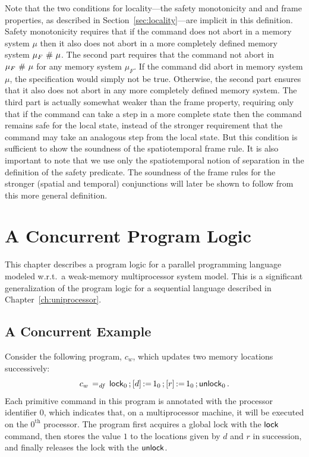 \documentclass[11pt]{report}
\begin{document}
Note that the two conditions for locality---the safety monotonicity and and frame properties, as described in Section~\ref{sec:locality}---are implicit in this definition. Safety monotonicity requires that if the command does not abort in a memory system $\mu$ then it also does not abort in a more completely defined memory system $\mu_F \operatorname{\,\#\,} \mu$. The second part requires that the command not abort in $\mu_F \operatorname{\,\#\,} \mu$ for any memory system $\mu_F$. If the command did abort in memory system $\mu$, the specification would simply not be true. Otherwise, the second part ensures that it also does not abort in any more completely defined memory system. The third part is actually somewhat weaker than the frame property, requiring only that if the command can take a step in a more complete state then the command remains safe for the local state, instead of the stronger requirement that the command may take an analogous step from the local state. But this condition is sufficient to show the soundness of the spatiotemporal frame rule. It is also important to note that we use only the spatiotemporal notion of separation in the definition of the safety predicate. The soundness of the frame rules for the stronger (spatial and temporal) conjunctions will later be shown to follow from this more general definition.

\chapter{A Concurrent Program Logic}
\label{ch:multiprocessor}

This chapter describes a program logic for a parallel programming language modeled w.r.t.\ a weak-memory multiprocessor system model. This is a significant generalization of the program logic for a sequential language described in Chapter~\ref{ch:uniprocessor}. 

\section{A Concurrent Example}
\label{sec:concurrent-example}

Consider the following program, $c_w$, which updates two memory locations successively: \[ c_w \operatorname{\;=_{\mathit{df}}\;} \operatorname{\mathsf{lock}}_0 \operatorname{;} \left[ d \right] \operatorname{:\!=} 1_0 \operatorname{;} \left[ r \right] \operatorname{:\!=} 1_0 \operatorname{;} \operatorname{\mathsf{unlock}}_0. \] Each primitive command in this program is annotated with the processor identifier $0$, which indicates that, on a multiprocessor machine, it will be executed on the $0^{\mathrm{th}}$ processor. The program first acquires a global lock with the $\operatorname{\mathsf{lock}}$
 command, then stores the value $1$ to the locations given by $d$ and $r$ in succession, and finally releases the lock with the $\operatorname{\mathsf{unlock}}$. 
\end{document}

